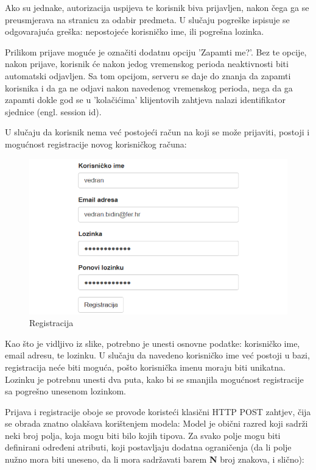 \documentclass[times, utf8, zavrsni, numeric]{fer}
\begin{document}
Ako su jednake, autorizacija uspijeva te korisnik biva prijavljen, nakon čega ga se preusmjerava na stranicu za odabir predmeta. U slučaju pogreške ispisuje se odgovarajuća greška: nepostojeće korisničko ime, ili pogrešna lozinka.

Prilikom prijave moguće je označiti dodatnu opciju 'Zapamti me?'. Bez te opcije, nakon prijave, korisnik će nakon jedog vremenskog perioda neaktivnosti biti automatski odjavljen. Sa tom opcijom, serveru se daje do znanja da zapamti korisnika i da ga ne odjavi nakon navedenog vremenskog perioda, nega da ga zapamti dokle god se u 'kolačićima' klijentovih zahtjeva nalazi identifikator sjednice (engl. session id).

U slučaju da korisnik nema već postojeći račun na koji se može prijaviti, postoji i mogućnost registracije novog korisničkog računa:

\begin{figure}[H]
\centering
\includegraphics[width=\textwidth,height=\textheight,keepaspectratio]{img/registracija.png}
\caption{Registracija}
\label{fig:registracija}
\end{figure}

Kao što je vidljivo iz slike, potrebno je unesti osnovne podatke: korisničko ime, email adresu, te lozinku. U slučaju da navedeno korisničko ime već postoji u bazi, registracija neće biti moguća, pošto korisnička imenu moraju biti unikatna. Lozinku je potrebnu unesti dva puta, kako bi se smanjila mogućnost registracije sa pogrešno unesenom lozinkom.

Prijava i registracije oboje se provode koristeći klasični HTTP POST zahtjev, čija se obrada znatno olakšava korištenjem modela:
Model je obični razred koji sadrži neki broj polja, koja mogu biti bilo kojih tipova. Za svako polje mogu biti definirani određeni atributi, koji postavljaju dodatna ograničenja (da li polje nužno mora biti uneseno, da li mora sadržavati barem \textbf{N} broj znakova, i slično):
\end{document}
